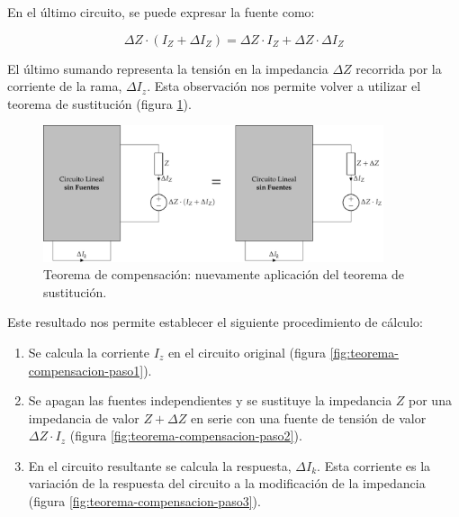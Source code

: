 En el último circuito, se puede expresar la fuente como:

\begin{equation}
  \Delta Z \cdot (I_Z + \Delta I_Z) = \Delta Z \cdot I_Z + \Delta Z \cdot \Delta I_Z
\end{equation}

El último sumando representa la tensión en la impedancia $\Delta Z$  recorrida por la corriente de la rama, $\Delta I_z$. Esta observación nos permite volver a utilizar el teorema de sustitución (figura \ref{fig:teorema-compensacion3}).

\begin{figure}[H]
  \centering
  \includegraphics[height=4cm]{../figs/TeoremaCompensacion3.pdf}
  \caption{Teorema de compensación: nuevamente aplicación del teorema de sustitución.}
  \label{fig:teorema-compensacion3}
\end{figure}


Este resultado nos permite establecer el siguiente procedimiento de cálculo:

\begin{enumerate}
\item Se calcula la corriente $I_z$ en el circuito original (figura \ref{fig:teorema-compensacion-paso1}).
\item Se apagan las fuentes independientes y se sustituye la impedancia $Z$ por una impedancia de valor $Z + \Delta Z$ en serie con una fuente de tensión de valor $\Delta Z \cdot I_z$ (figura \ref{fig:teorema-compensacion-paso2}).
\item En el circuito resultante se calcula la respuesta, $\Delta I_k$. Esta corriente es la variación de la respuesta del circuito a la modificación de la impedancia (figura \ref{fig:teorema-compensacion-paso3}).
\end{enumerate}


